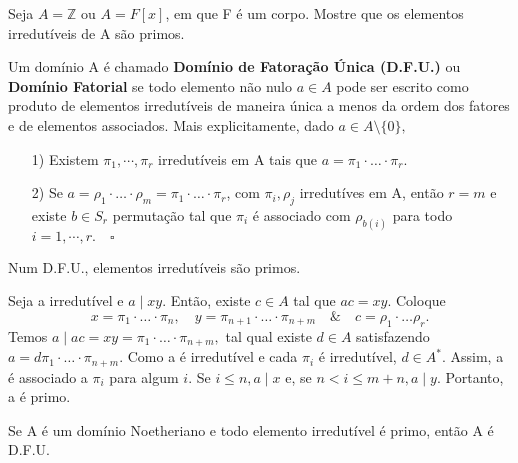 \documentclass[algebraII_notes.tex]{subfiles}
\begin{document}
\begin{example}[Exercício]
	Seja \(A = \mathbb{Z}\) ou \(A = F[x]\), em que F é um corpo. Mostre que os elementos irredutíveis de A são primos.
\end{example}
\begin{def*}
	Um domínio A é chamado \textbf{Domínio de Fatoração Única (D.F.U.)} ou \textbf{Domínio Fatorial} se
	todo elemento não nulo \(a\in A\) pode ser escrito como produto de elementos irredutíveis de maneira única a menos
	da ordem dos fatores e de elementos associados. Mais explicitamente, dado \(a\in A\setminus{\{0\}},\)
	\begin{itemize}
		\item[1)] Existem \(\pi_{1}, \cdots, \pi_{r}\) irredutíveis em A tais que \(a = \pi_{1}\cdot \dotsc \cdot \pi_{r}.\)
		\item[2)] Se \(a = \rho_{1}\cdot\dotsc \cdot \rho_{m} = \pi_{1}\cdot \dotsc \cdot \pi_{r}\), com \(\pi_{i}, \rho_{j}\) irredutíves em A, então \(r = m\)
		      e existe \(b\in S_{r}\) permutação tal que \(\pi_{i}\) é associado com \(\rho_{b(i)}\) para todo \(i=1, \cdots, r. \quad\square\)
	\end{itemize}
\end{def*}
\begin{prop*}
	Num D.F.U., elementos irredutíveis são primos.
\end{prop*}
\begin{proof*}
	Seja a irredutível e \(a\mid xy\). Então, existe \(c\in A\) tal que \(ac = xy.\) Coloque
	\[
		x = \pi_{1} \cdot \dotsc \cdot \pi_{n},\quad y = \pi_{n+1}\cdot \dotsc \cdot \pi_{n+m}\quad\&\quad c=\rho_{1}\cdot \dotsc \rho_{r}.
	\]
	Temos \(a\mid ac = xy = \pi_{1}\cdot \dotsc \cdot \pi_{n+m},\) tal qual existe \(d\in A\) satisfazendo \(a = d\pi_{1}\cdot \dotsc \cdot \pi_{n+m}.\) Como a é
	irredutível e cada \(\pi_{i}\) é irredutível, \(d\in A^{*}.\) Assim, a é associado a \(\pi_{i}\) para algum \(i.\) Se \(i\leq n, a\mid x\) e, se \(n < i\leq m + n, a \mid y.\)
	Portanto, a é primo. \qedsymbol
\end{proof*}
\begin{prop*}
	Se A é um domínio Noetheriano e todo elemento irredutível é primo, então A é D.F.U.
\end{prop*}
\end{document}
